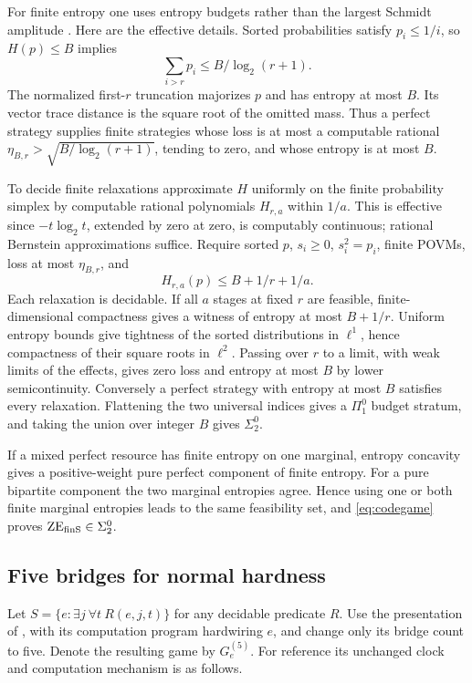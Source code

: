 For finite entropy one uses entropy budgets rather than the largest Schmidt amplitude \cite[Section~3.4]{Sigma2}. Here are the effective details. Sorted probabilities satisfy $p_i\leq1/i$, so $H(p)\leq B$ implies
\[
 \sum_{i>r}p_i\leq B/\log_2(r+1).
\]
The normalized first-$r$ truncation majorizes $p$ and has entropy at most $B$. Its vector trace distance is the square root of the omitted mass. Thus a perfect strategy supplies finite strategies whose loss is at most a computable rational $\eta_{B,r}>\sqrt{B/\log_2(r+1)}$, tending to zero, and whose entropy is at most $B$.

To decide finite relaxations approximate $H$ uniformly on the finite probability simplex by computable rational polynomials $H_{r,a}$ within $1/a$. This is effective since $-t\log_2t$, extended by zero at zero, is computably continuous; rational Bernstein approximations suffice. Require sorted $p$, $s_i\geq0$, $s_i^2=p_i$, finite POVMs, loss at most $\eta_{B,r}$, and
\[
 H_{r,a}(p)\leq B+1/r+1/a.
\]
Each relaxation is decidable. If all $a$ stages at fixed $r$ are feasible, finite-dimensional compactness gives a witness of entropy at most $B+1/r$. Uniform entropy bounds give tightness of the sorted distributions in $\ell^1$, hence compactness of their square roots in $\ell^2$. Passing over $r$ to a limit, with weak limits of the effects, gives zero loss and entropy at most $B$ by lower semicontinuity. Conversely a perfect strategy with entropy at most $B$ satisfies every relaxation. Flattening the two universal indices gives a $\Pi^0_1$ budget stratum, and taking the union over integer $B$ gives $\Sigma^0_2$.

If a mixed perfect resource has finite entropy on one marginal, entropy concavity gives a positive-weight pure perfect component of finite entropy. For a pure bipartite component the two marginal entropies agree. Hence using one or both finite marginal entropies leads to the same feasibility set, and \eqref{eq:codegame} proves $\mathrm{ZE}_{\mathrm{finS}}\in\Sigma^0_2$.

\subsection{Five bridges for normal hardness}
Let $S=\{e:\exists j\ \forall t\ R(e,j,t)\}$ for any decidable predicate $R$. Use the presentation of \cite[Sections~5--7]{Sigma2}, with its computation program hardwiring $e$, and change only its bridge count to five. Denote the resulting game by $G_e^{(5)}$. For reference its unchanged clock and computation mechanism is as follows.

